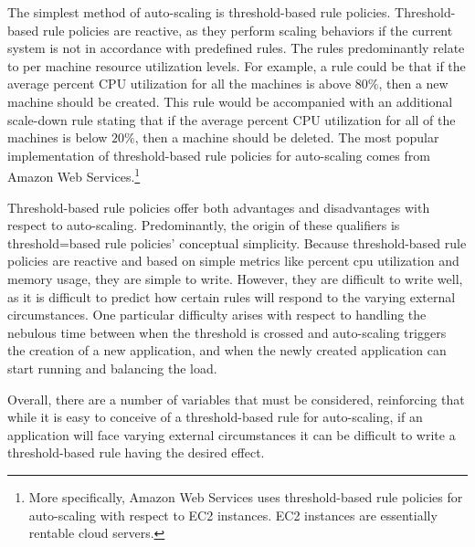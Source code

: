 The simplest method of auto-scaling is threshold-based rule policies.
Threshold-based rule policies are reactive, as they perform scaling behaviors if
the current system is not in accordance with predefined rules. The rules
predominantly relate to per machine resource utilization levels. For example, a
rule could be that if the average percent CPU utilization for all the
machines is above $80\%$, then a new machine should be created. This rule would
be accompanied with an additional scale-down rule stating that if the average
percent CPU utilization for all of the machines is below $20\%$, then a machine
should be deleted. The most popular implementation of threshold-based rule
policies for auto-scaling comes from Amazon Web Services.\footnote{More
specifically, Amazon Web Services uses threshold-based rule policies for
auto-scaling with respect to EC2 instances. EC2 instances are essentially
rentable cloud
servers.\cite{amazon-ec2}}\cite{amazon-auto-scaling-developer-guide}

Threshold-based rule policies offer both advantages and disadvantages with
respect to auto-scaling. Predominantly, the origin of these qualifiers is
threshold=based rule policies' conceptual simplicity.
Because threshold-based rule policies are reactive and based on simple metrics
like percent cpu utilization and memory usage, they are simple to write.
However, they are difficult to write well, as it is difficult to predict how
certain rules will respond to the varying external circumstances. One particular
difficulty arises with respect to handling the nebulous time between when the
threshold is crossed and auto-scaling triggers the creation of a new
application, and when the newly created application can start running and
balancing the load.

Overall, there are a number of variables that must be considered, reinforcing
that while it is easy to conceive of a threshold-based rule for auto-scaling, if
an application will face varying external circumstances it can be difficult to
write a threshold-based rule having the desired effect.

